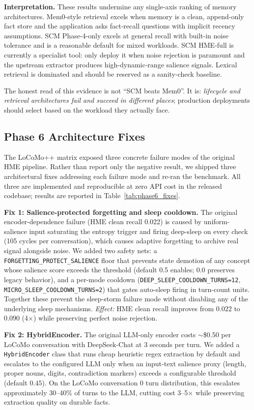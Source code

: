 \documentclass[11pt,twocolumn]{article}
\begin{document}
\textbf{Interpretation.} These results undermine any single-axis ranking of memory architectures. Mem0-style retrieval excels when memory is a clean, append-only fact store and the application asks fact-recall questions with implicit recency assumptions. SCM Phase-4-only excels at general recall with built-in noise tolerance and is a reasonable default for mixed workloads. SCM HME-full is currently a specialist tool: only deploy it when noise rejection is paramount and the upstream extractor produces high-dynamic-range salience signals. Lexical retrieval is dominated and should be reserved as a sanity-check baseline.

The honest read of this evidence is not ``SCM beats Mem0''. It is: \emph{lifecycle and retrieval architectures fail and succeed in different places}; production deployments should select based on the workload they actually face.

\subsection{Phase 6 Architecture Fixes}
\label{sec:phase6_fixes}

The LoCoMo++ matrix exposed three concrete failure modes of the original HME pipeline. Rather than report only the negative result, we shipped three architectural fixes addressing each failure mode and re-ran the benchmark. All three are implemented and reproducible at zero API cost in the released codebase; results are reported in Table~\ref{tab:phase6_fixes}.

\textbf{Fix 1: Salience-protected forgetting and sleep cooldown.} The original encoder-dependence failure (HME clean recall 0.022) is caused by uniform-salience input saturating the entropy trigger and firing deep-sleep on every check (105 cycles per conversation), which causes adaptive forgetting to archive real signal alongside noise. We added two safety nets: a \texttt{FORGETTING\_PROTECT\_SALIENCE} floor that prevents state demotion of any concept whose salience score exceeds the threshold (default 0.5 enables; 0.0 preserves legacy behavior), and a per-mode cooldown (\texttt{DEEP\_SLEEP\_COOLDOWN\_TURNS=12}, \texttt{MICRO\_SLEEP\_COOLDOWN\_TURNS=2}) that gates auto-sleep firing in turn-count units. Together these prevent the sleep-storm failure mode without disabling any of the underlying sleep mechanisms. \emph{Effect:} HME clean recall improves from $0.022$ to $0.090$ (4$\times$) while preserving perfect noise rejection.

\textbf{Fix 2: HybridEncoder.} The original LLM-only encoder costs $\sim$\$0.50 per LoCoMo conversation with DeepSeek-Chat at 3 seconds per turn. We added a \texttt{HybridEncoder} class that runs cheap heuristic regex extraction by default and escalates to the configured LLM only when an input-text salience proxy (length, proper nouns, digits, contradiction markers) exceeds a configurable threshold (default $0.45$). On the LoCoMo conversation 0 turn distribution, this escalates approximately 30--40\% of turns to the LLM, cutting cost 3--5$\times$ while preserving extraction quality on durable facts.
\end{document}
